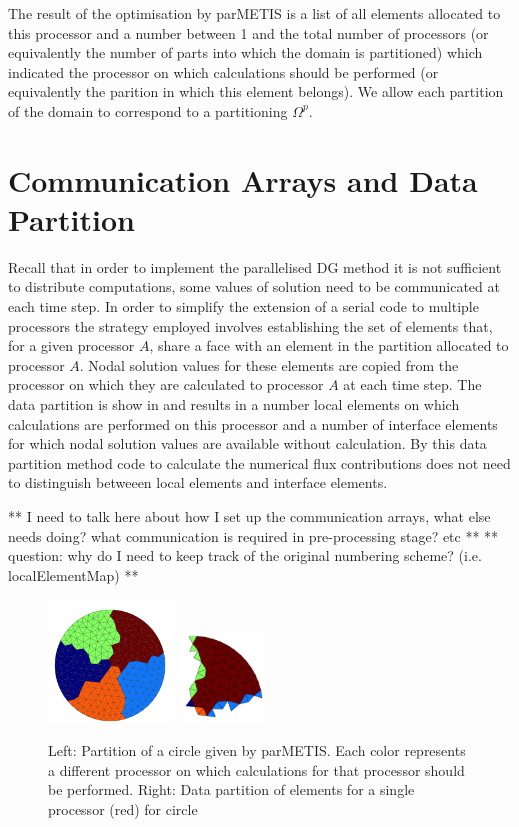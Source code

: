 The result of the optimisation by parMETIS is a list of all elements allocated to this processor and a number between 1 and the total number of processors (or equivalently the number of parts into which the domain is partitioned) which indicated the processor on which calculations should be performed (or equivalently the parition in which this element belongs). We allow each partition of the domain to correspond to a partitioning $\Omega^p$.

\section{Communication Arrays and Data Partition}

Recall that in order to implement the parallelised DG method it is not sufficient to distribute computations, some values of solution need to be communicated at each time step. In order to simplify the extension of a serial code to multiple processors the strategy employed involves establishing the set of elements that, for a given processor $A$, share a face with an element in the partition allocated to processor $A$. Nodal solution values for these elements are copied from the processor on which they are calculated to processor $A$ at each time step. The data partition is show in  and results in a number local elements on which calculations are performed on this processor and a number of interface elements for which nodal solution values are available without calculation. By this data partition method code to calculate the numerical flux contributions does not need to distinguish betweeen local elements and interface elements.

** I need to talk here about how I set up the communication arrays, what else needs doing? what communication is required in pre-processing stage? etc **
** question: why do I need to keep track of the original numbering scheme? (i.e. localElementMap) **

\begin{figure}[htbp!]
 \centering
 \includegraphics[width=0.3\textwidth]{Figures/Parallelisation/parmetisPartition}
 \includegraphics[width=0.2\textwidth]{Figures/Parallelisation/parmetisDataPartition}
\caption{Left: Partition of a circle given by parMETIS. Each color represents a different processor on which calculations for that processor should be performed. Right: Data partition of elements for a single processor (red) for circle}
\label{parmetis-figure}
\end{figure}

